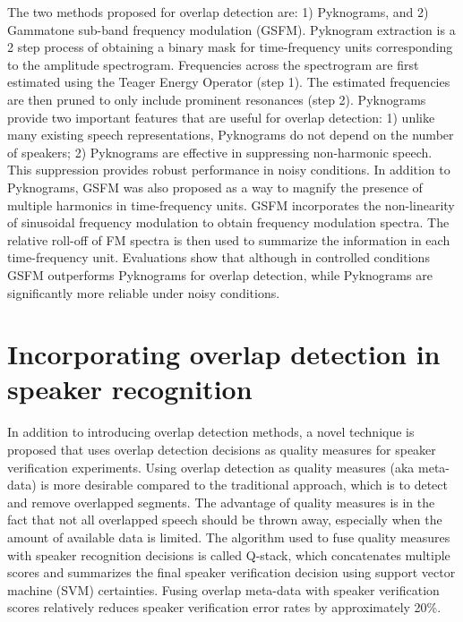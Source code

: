 The two methods proposed for overlap detection are: 1) Pyknograms, and 2) Gammatone sub-band frequency modulation (GSFM). 
Pyknogram extraction is a 2 step process of obtaining a binary mask for time-frequency units corresponding to the amplitude spectrogram. 
Frequencies across the spectrogram are first estimated using the Teager Energy Operator (step 1). 
The estimated frequencies are then pruned to only include prominent resonances (step 2). 
Pyknograms provide two important features that are useful for overlap detection: 1) unlike many existing speech representations, Pyknograms do not depend on the number of speakers; 2) Pyknograms are effective in suppressing non-harmonic speech. This suppression provides robust performance in noisy conditions. 
In addition to Pyknograms, GSFM was also proposed as a way to magnify the presence of multiple harmonics in time-frequency units. 
GSFM incorporates the non-linearity of sinusoidal frequency modulation to obtain frequency modulation spectra. 
The relative roll-off of FM spectra is then used to summarize the information in each time-frequency unit. 
Evaluations show that although in controlled conditions GSFM outperforms Pyknograms for overlap detection, while Pyknograms are significantly more reliable under noisy conditions. 

\section{Incorporating overlap detection in speaker recognition}
In addition to introducing overlap detection methods, a novel technique is proposed that uses overlap detection decisions as quality measures for speaker verification experiments. 
Using overlap detection as quality measures (aka meta-data) is more desirable compared to the traditional approach, which is to detect and remove overlapped segments. 
The advantage of quality measures is in the fact that not all overlapped speech should be thrown away, especially when the amount of available data is limited. 
The algorithm used to fuse quality measures with speaker recognition decisions is called Q-stack, which concatenates multiple scores and summarizes the final speaker verification decision using support vector machine (SVM) certainties. 
Fusing overlap meta-data with speaker verification scores relatively reduces speaker verification error rates by approximately 20\%. 

